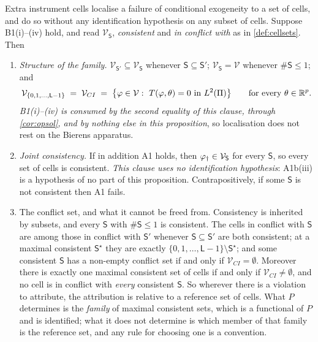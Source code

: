 \begin{proposition}\label{prp:localise}
Extra instrument cells localise a failure of conditional exogeneity to a set of cells, and do so without
any identification hypothesis on any subset of cells.
Suppose B1(i)--(iv) hold, and read $\mathcal V_{\mathsf S}$, \emph{consistent} and \emph{in conflict with}
as in \cref{def:cellsets}. Then
\begin{enumerate}
\item[(i)] \emph{Structure of the family.} $\mathcal V_{\mathsf S'}\subseteq\mathcal V_{\mathsf S}$
whenever $\mathsf S\subseteq\mathsf S'$; $\mathcal V_{\mathsf S}=\mathcal V$ whenever
$\#\mathsf S\le1$; and
\[
\mathcal V_{\{0,1,\dots,\mathsf L-1\}}\;=\;\mathcal V_{CI}\;=\;\big\{\varphi\in\mathcal V:\ T(\varphi,\theta)=0\ \text{in }L^{2}(\Pi)\big\}
\qquad\text{for every }\theta\in\IR^{p}.
\]
\emph{B1\textup{(i)}--\textup{(iv)} is consumed by the second equality of this clause, through
\cref{cor:opsol}, and by nothing else in this proposition}, so localisation does not rest on the Bierens
apparatus.
\item[(ii)] \emph{Joint consistency.} If in addition A1 holds, then $\varphi_{\dagger}\in\mathcal V_{\mathsf S}$
for every $\mathsf S$, so every set of cells is consistent. \emph{This clause uses no identification
hypothesis}: A1b(iii) is a hypothesis of no part of this proposition. Contrapositively, if some
$\mathsf S$ is not consistent then A1 fails.
\item[(iii)] The conflict set, and what it cannot be freed from. Consistency is inherited by
subsets, and every $\mathsf S$ with $\#\mathsf S\le1$ is consistent. The cells in conflict with
$\mathsf S$ are among those in conflict with $\mathsf S'$ whenever $\mathsf S\subseteq\mathsf S'$ are
both consistent; at a maximal consistent $\mathsf S^{\star}$ they are exactly
$\{0,1,\dots,\mathsf L-1\}\setminus\mathsf S^{\star}$; and some consistent $\mathsf S$ has a non-empty
conflict set if and only if $\mathcal V_{CI}=\emptyset$. Moreover there is exactly one maximal consistent
set of cells if and only if $\mathcal V_{CI}\neq\emptyset$, and no cell is in conflict with \emph{every}
consistent $\mathsf S$. So wherever there is a violation to attribute, the attribution is relative
to a reference set of cells. What $P$ determines is the \emph{family} of maximal consistent sets, which
is a functional of $P$ and is identified; what it does not determine is which member of that family is
the reference set, and any rule for choosing one is a convention.

\end{enumerate}
\end{proposition}
